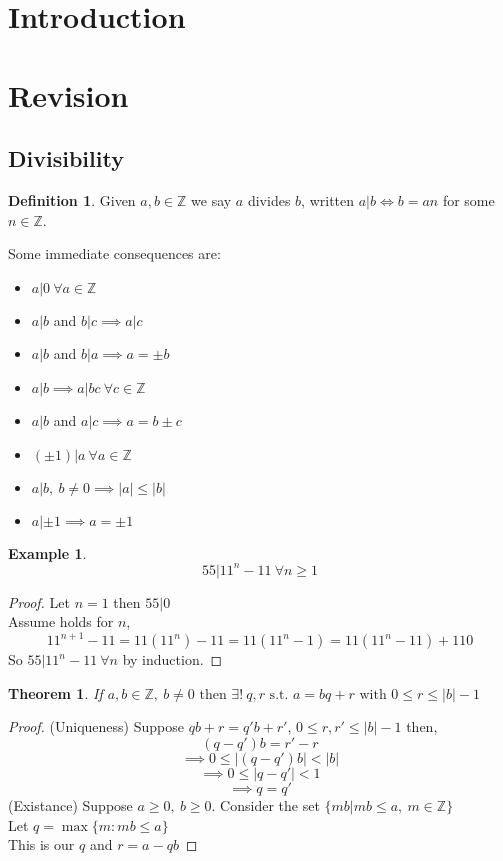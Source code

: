 \documentclass{article}
\newtheorem*{thm}{Theorem}
\theoremstyle{definition}
\newtheorem*{defn}{Definition}
\newtheorem*{ex}{Example}
\newcommand{\ZZ}{\mathbb{Z}}
\begin{document}
\maketitle
\tableofcontents
\section*{Introduction}

\section{Revision}
\subsection{Divisibility}
\begin{defn}
Given $a,b \in \ZZ$ we say $a$ divides $b$, written $a|b \iff b=an$ for some $n \in \ZZ$. 
\end{defn}
Some immediate consequences are:
\begin{itemize}
\item $a|0\ \forall a \in \ZZ$
\item $a|b$ and $b|c \implies a|c$
\item $a|b$ and $b|a \implies a = \pm b$
\item $a|b \implies a|bc\ \forall c \in \ZZ$
\item $a|b$ and $a|c \implies a = b \pm c$
\item $(\pm 1)|a\  \forall a \in \ZZ$
\item $a|b,\ b\neq 0 \implies |a| \leq |b|$
\item $a|\pm1 \implies a = \pm 1$
\end{itemize}
\begin{ex}
$$55| 11^n - 11\ \forall n \geq 1$$
\end{ex}
\begin{proof}
Let $n=1$ then $55|0$ \\
Assume holds for $n$,
    $$11^{n+1}-11=11(11^n)-11=11(11^n-1) = 11(11^n-11)+110$$
So $55|11^n-11\ \forall n$ by induction.
\end{proof}
\begin{thm}
If $a,b \in \ZZ,\ b\neq 0\text{ then }\exists!\ q,r \text{ s.t. } a = bq +r\text{ with }0\leq r \leq |b|-1$
\end{thm}
\begin{proof}(Uniqueness)
Suppose $qb+r=q'b+r'$, $0\leq r,r' \leq|b|-1$ then,
	$$(q-q')b=r'-r$$
	$$\implies 0 \leq |(q-q')b|<|b|$$
	$$\implies 0 \leq |q-q'| < 1$$
	$$\implies q=q'$$
(Existance) Suppose $a \geq 0,\ b\geq 0$. Consider the set $\{mb|mb \leq a,\ m\in\ZZ\}$\\
	Let $q=\max\{m:mb\leq a\}$ \\
	This is our $q$ and $r = a-qb$
\end{proof}
\end{document}
